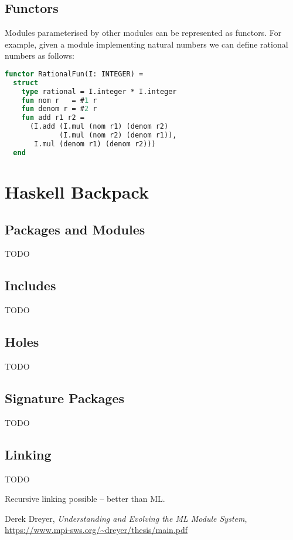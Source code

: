 \documentclass[11pt,twoside,a4paper]{article} %
\begin{document}
\subsection{Functors}

Modules parameterised by other modules can be represented as functors. For example, given a module implementing natural numbers we can define rational numbers as follows:
\begin{lstlisting}[language=ML]
functor RationalFun(I: INTEGER) =
  struct
    type rational = I.integer * I.integer
    fun nom r   = #1 r
    fun denom r = #2 r
    fun add r1 r2 = 
      (I.add (I.mul (nom r1) (denom r2) 
             (I.mul (nom r2) (denom r1)),
       I.mul (denom r1) (denom r2)))
  end
\end{lstlisting}

\section{Haskell Backpack}

\subsection{Packages and Modules}

TODO

\subsection{Includes}

TODO

\subsection{Holes}

TODO

\subsection{Signature Packages}

TODO

\subsection{Linking}

TODO

Recursive linking possible -- better than ML.

\begin{thebibliography}{9}
	 Derek Dreyer, \emph{Understanding and Evolving the ML Module System}, \url{https://www.mpi-sws.org/~dreyer/thesis/main.pdf}
\end{thebibliography}
\end{document}

